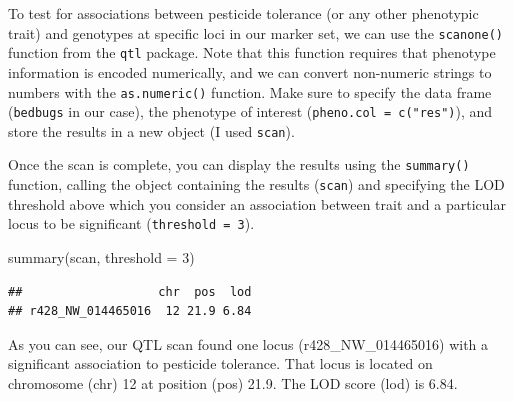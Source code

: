 \documentclass[
]{book}
\newenvironment{Shaded}{\begin{snugshade}}{\end{snugshade}}
\newcommand{\AttributeTok}[1]{\textcolor[rgb]{0.77,0.63,0.00}{#1}}
\newcommand{\CommentTok}[1]{\textcolor[rgb]{0.56,0.35,0.01}{\textit{#1}}}
\newcommand{\DecValTok}[1]{\textcolor[rgb]{0.00,0.00,0.81}{#1}}
\newcommand{\FunctionTok}[1]{\textcolor[rgb]{0.00,0.00,0.00}{#1}}
\newcommand{\NormalTok}[1]{#1}
\newcommand{\OtherTok}[1]{\textcolor[rgb]{0.56,0.35,0.01}{#1}}
\newcommand{\SpecialCharTok}[1]{\textcolor[rgb]{0.00,0.00,0.00}{#1}}
\newcommand{\StringTok}[1]{\textcolor[rgb]{0.31,0.60,0.02}{#1}}
\begin{document}
To test for associations between pesticide tolerance (or any other phenotypic trait) and genotypes at specific loci in our marker set, we can use the \texttt{scanone()} function from the \texttt{qtl} package. Note that this function requires that phenotype information is encoded numerically, and we can convert non-numeric strings to numbers with the \texttt{as.numeric()} function. Make sure to specify the data frame (\texttt{bedbugs} in our case), the phenotype of interest (\texttt{pheno.col\ =\ c("res")}), and store the results in a new object (I used \texttt{scan}).

\begin{Shaded}
\end{Shaded}

Once the scan is complete, you can display the results using the \texttt{summary()} function, calling the object containing the results (\texttt{scan}) and specifying the LOD threshold above which you consider an association between trait and a particular locus to be significant (\texttt{threshold\ =\ 3}).

\begin{Shaded}
\begin{Highlighting}[]
\FunctionTok{summary}\NormalTok{(scan, }\AttributeTok{threshold =} \DecValTok{3}\NormalTok{)}
\end{Highlighting}
\end{Shaded}

\begin{verbatim}
##                   chr  pos  lod
## r428_NW_014465016  12 21.9 6.84
\end{verbatim}

As you can see, our QTL scan found one locus (r428\_NW\_014465016) with a significant association to pesticide tolerance. That locus is located on chromosome (chr) 12 at position (pos) 21.9. The LOD score (lod) is 6.84.
\end{document}
